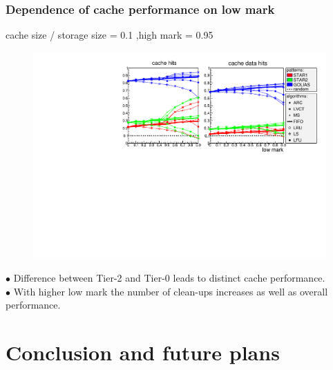 \documentclass{beamer}
\begin{document}
\begin{frame}\frametitle{Dependence of cache performance on low mark}
\vspace{-0.4cm}
\begin{tiny}	cache size / storage size = 0.1 ,high mark = 0.95 \end{tiny}
\begin{figure}
\vspace{-0.4cm}
	\begin{center}
		\centering
		\includegraphics[width=\textwidth]{pic/low-basic_color.pdf}
	\end{center}
\end{figure}	
\vspace{-0.5cm}
$\bullet $ Difference between Tier-2 and Tier-0 leads to distinct cache performance.\\
$\bullet $ With higher low mark the number of clean-ups increases as well as overall performance.\\


\end{frame}

\section{Conclusion and future plans}

\begin{frame}\frametitle{}

\end{frame}

\printbibliography
\end{document}
